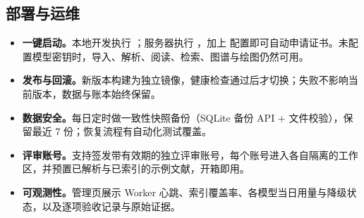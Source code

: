 \subsection{部署与运维}

\begin{itemize}
  \item \textbf{一键启动。}本地开发执行 ；服务器执行 ，加上  配置即可自动申请证书。未配置模型密钥时，导入、解析、阅读、检索、图谱与绘图仍然可用。
  \item \textbf{发布与回滚。}新版本构建为独立镜像，健康检查通过后才切换；失败不影响当前版本，数据与账本始终保留。
  \item \textbf{数据安全。}每日定时做一致性快照备份（SQLite 备份 API + 文件校验），保留最近 7 份；恢复流程有自动化测试覆盖。
  \item \textbf{评审账号。}支持签发带有效期的独立评审账号，每个账号进入各自隔离的工作区，并预置已解析与已索引的示例文献，开箱即用。
  \item \textbf{可观测性。}管理页展示 Worker 心跳、索引覆盖率、各模型当日用量与降级状态，以及逐项验收记录与原始证据。
\end{itemize}

